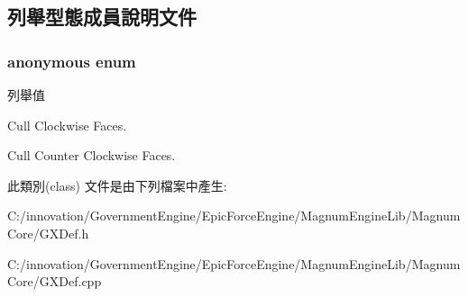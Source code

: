 \subsection{列舉型態成員說明文件}
\subsubsection[{\texorpdfstring{anonymous enum}{anonymous enum}}]{\setlength{\rightskip}{0pt plus 5cm}anonymous enum}\hypertarget{class_i_dream_sky_1_1_g_x_cull_mode_a53fb9da080190bd0117091a96b82e0ee}{}\label{class_i_dream_sky_1_1_g_x_cull_mode_a53fb9da080190bd0117091a96b82e0ee}
\begin{Desc}
\item[列舉值]\par
\begin{description}
\item[{\em 
CW\hypertarget{class_i_dream_sky_1_1_g_x_cull_mode_a53fb9da080190bd0117091a96b82e0eea4a93ec35267d974dc03aaf02974cc306}{}\label{class_i_dream_sky_1_1_g_x_cull_mode_a53fb9da080190bd0117091a96b82e0eea4a93ec35267d974dc03aaf02974cc306}
}]Cull Clockwise Faces. \item[{\em 
C\+CW\hypertarget{class_i_dream_sky_1_1_g_x_cull_mode_a53fb9da080190bd0117091a96b82e0eea0e7f7609700d64eba250f44ddf5358b8}{}\label{class_i_dream_sky_1_1_g_x_cull_mode_a53fb9da080190bd0117091a96b82e0eea0e7f7609700d64eba250f44ddf5358b8}
}]Cull Counter Clockwise Faces. \end{description}
\end{Desc}


此類別(class) 文件是由下列檔案中產生\+:\begin{DoxyCompactItemize}
\item 
C\+:/innovation/\+Government\+Engine/\+Epic\+Force\+Engine/\+Magnum\+Engine\+Lib/\+Magnum\+Core/G\+X\+Def.\+h\item 
C\+:/innovation/\+Government\+Engine/\+Epic\+Force\+Engine/\+Magnum\+Engine\+Lib/\+Magnum\+Core/G\+X\+Def.\+cpp\end{DoxyCompactItemize}
